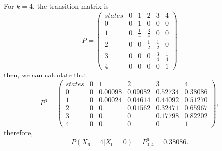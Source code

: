 \documentclass{article}
\begin{document}
\subsection{}
For $k=4$, the transition matrix is
\begin{equation*}
    P=
    \begin{pmatrix}
    states&0&1&2&3&4\\
    0&0&1&0&0&0\\
    1&0&\frac{1}{4}&\frac{3}{4}&0&0\\
    2&0&0&\frac{1}{2}&\frac{1}{2}&0\\
    3&0&0&0&\frac{3}{4}&\frac{1}{4}\\
    4&0&0&0&0&1
    \end{pmatrix}
\end{equation*}
then, we can calculate that 
\begin{equation*}
    P^6=
    \begin{pmatrix}
    states&0&1&2&3&4\\
    0&0&0.00098&0.09082&0.52734&0.38086\\
    1&0&0.00024&0.04614&0.44092&0.51270\\
    2&0&0&0.01562&0.32471&0.65967\\
    3&0&0&0&0.17798&0.82202\\
    4&0&0&0&0&1
    \end{pmatrix},
\end{equation*}
therefore,
\begin{equation*}
    P(X_6=4|X_0=0)=P^6_{0,4}=0.38086.
\end{equation*}
\end{document}
